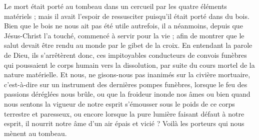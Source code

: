 Le mort était porté au tombeau dans un cercueil par les quatre éléments matériels ; mais il avait l’espoir de ressusciter puisqu’il était porté dans du bois. Bien que le bois ne nous ait pas été utile autrefois, il a néanmoins, depuis que Jésus-Christ l’a touché, commencé à servir pour la vie ; afin de montrer que le salut devait être rendu au monde par le gibet de la croix. En entendant la parole de Dieu, ils s’arrêtèrent donc, ces impitoyables conducteurs de convois funèbres qui poussaient le corps humain vers la dissolution, par suite du cours mortel de la nature matérielle. Et nous, ne gisons-nous pas inanimés sur la civière mortuaire, c’est-à-dire sur un instrument des dernières pompes funèbres, lorsque le feu des passions déréglées nous brûle, ou que la froideur inonde nos âmes ou bien quand nous sentons la vigueur de notre esprit s’émousser sous le poids de ce corps terrestre et paresseux, ou encore lorsque la pure lumière faisant défaut à notre esprit, il nourrit notre âme d’un air épais et vicié ? Voilà les porteurs qui nous mènent au tombeau.
